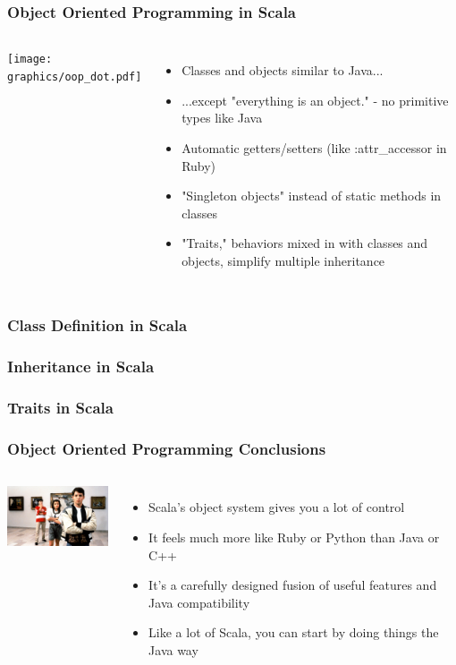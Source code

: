 \begin{frame} 
\frametitle{Object Oriented Programming in Scala}
\begin{columns}[c]
  \column{1.0in}
    \texttt{[image: graphics/oop\_dot.pdf]} 
  \column{2.0in}
    \begin{itemize}
      \item<1-> Classes and objects similar to Java...
      \item<2-> ...except "everything is an object." - no primitive types like Java
      \item<3-> Automatic getters/setters (like :attr\_accessor in Ruby)
      \item<4-> "Singleton objects" instead of static methods in classes
      \item<5-> "Traits," behaviors mixed in with classes and objects, simplify multiple inheritance
    \end{itemize}
\end{columns}
\end{frame} 

\begin{frame}
\frametitle{Class Definition in Scala}
\tt\small{

}
\end{frame} 

\begin{frame}
\frametitle{Inheritance in Scala}
\tt\tiny{

}
\end{frame} 

\begin{frame}
\frametitle{Traits in Scala}
\tt\tiny{

}
\end{frame} 

\begin{frame} 
\frametitle{Object Oriented Programming Conclusions}
\begin{columns}[c]
  \column{1.0in}
    \includegraphics[width=1.5in]{graphics/ferris.jpg} 
  \column{2.0in}
    \begin{itemize}
      \item<1-> Scala's object system gives you a lot of control
      \item<2-> It feels much more like Ruby or Python than Java or C++
      \item<3-> It's a carefully designed fusion of useful features and Java compatibility
      \item<4-> Like a lot of Scala, you can start by doing things the Java way
    \end{itemize}
\end{columns}
\end{frame} 


